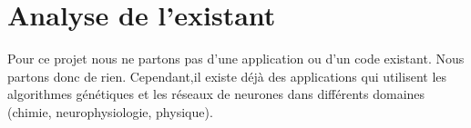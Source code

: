 \chapter{Analyse de l'existant}
Pour ce projet nous ne partons pas d'une application ou d'un code existant. Nous partons donc de rien.
Cependant,il existe déjà des applications qui utilisent les algorithmes génétiques et les réseaux de neurones dans différents domaines (chimie, neurophysiologie, physique).


\pagebreak

